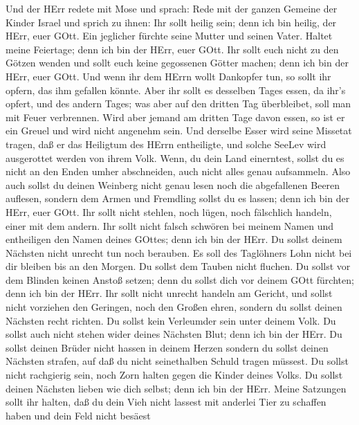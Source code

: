  Und der HErr redete mit Mose und sprach:  Rede
mit der ganzen Gemeine der Kinder Israel und sprich zu ihnen: Ihr sollt
heilig sein; denn ich bin heilig, der HErr, euer GOtt.  Ein
jeglicher fürchte seine Mutter und seinen Vater. Haltet meine Feiertage;
denn ich bin der HErr, euer GOtt.  Ihr sollt euch nicht zu
den Götzen wenden und sollt euch keine gegossenen Götter machen; denn
ich bin der HErr, euer GOtt.  Und wenn ihr dem HErrn wollt
Dankopfer tun, so sollt ihr opfern, das ihm gefallen könnte.
 Aber ihr sollt es desselben Tages essen, da ihr's opfert,
und des andern Tages; was aber auf den dritten Tag überbleibet, soll man
mit Feuer verbrennen.  Wird aber jemand am dritten Tage
davon essen, so ist er ein Greuel und wird nicht angenehm sein.
 Und derselbe Esser wird seine Missetat tragen, daß er das
Heiligtum des HErrn entheiligte, und solche SeeLev wird ausgerottet
werden von ihrem Volk.  Wenn, du dein Land einerntest,
sollst du es nicht an den Enden umher abschneiden, auch nicht alles
genau aufsammeln.  Also auch sollst du deinen Weinberg
nicht genau lesen noch die abgefallenen Beeren auflesen, sondern dem
Armen und Fremdling sollst du es lassen; denn ich bin der HErr, euer
GOtt.  Ihr sollt nicht stehlen, noch lügen, noch fälschlich
handeln, einer mit dem andern.  Ihr sollt nicht falsch
schwören bei meinem Namen und entheiligen den Namen deines GOttes; denn
ich bin der HErr.  Du sollst deinem Nächsten nicht unrecht
tun noch berauben. Es soll des Taglöhners Lohn nicht bei dir bleiben bis
an den Morgen.  Du sollst dem Tauben nicht fluchen. Du
sollst vor dem Blinden keinen Anstoß setzen; denn du sollst dich vor
deinem GOtt fürchten; denn ich bin der HErr.  Ihr sollt
nicht unrecht handeln am Gericht, und sollst nicht vorziehen den
Geringen, noch den Großen ehren, sondern du sollst deinen Nächsten recht
richten.  Du sollst kein Verleumder sein unter deinem Volk.
Du sollst auch nicht stehen wider deines Nächsten Blut; denn ich bin der
HErr.  Du sollst deinen Brüder nicht hassen in deinem
Herzen sondern du sollst deinen Nächsten strafen, auf daß du nicht
seinethalben Schuld tragen müssest.  Du sollst nicht
rachgierig sein, noch Zorn halten gegen die Kinder deines Volks. Du
sollst deinen Nächsten lieben wie dich selbst; denn ich bin der HErr.
 Meine Satzungen sollt ihr halten, daß du dein Vieh nicht
lassest mit anderlei Tier zu schaffen haben und dein Feld nicht besäest
